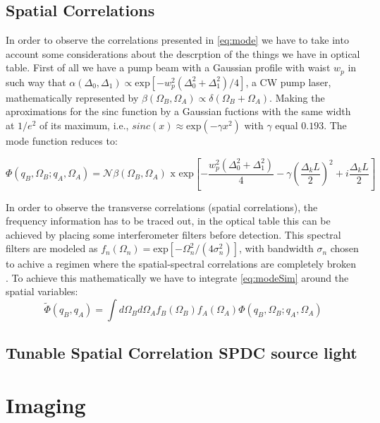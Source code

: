 \subsection{Spatial Correlations}

In order to observe the correlations presented in \ref{eq:mode} we have to take into account some considerations about the descrption of the things we have in optical table.
First of all we have a pump beam with a Gaussian profile with waist $w_p$ 
in such way that $\alpha (\Delta_0,\Delta_1 ) \propto \text{exp}[-w_p^2 (\Delta_0^2 + \Delta_1^2 )/4]$, a CW pump laser, mathematically represented by
$\beta (\Omega_B , \Omega_A) \propto \delta(\Omega_B + \Omega_A)$. Making the aproximations for the sinc function by a Gaussian fuctions with the same width at $1/e^2$ of its maximum,
i.e., $sinc(x) \approx \text{exp}(-\gamma x^2)$ with $\gamma$ equal $0.193$.
The mode function reduces to:

\begin{equation}
\label{eq:modeSim}
\Phi(q_B,\Omega_B;q_A,\Omega_A) = \mathcal{N} \beta (\Omega_B , \Omega_A)
\text{ x exp}\left[ -\frac{w_p^2 (\Delta_0^2 + \Delta_1^2 )}{4}-\gamma \left(\frac{\Delta_k L}{2} \right)^2 + i\frac{\Delta_k L}{2} \right]  
\end{equation}

In order to observe the transverse correlations (spatial correlations), the 
frequency information has to be traced out, in the optical table this can
be achieved by placing some interferometer filters before detection. This spectral
filters are modeled as $f_n (\Omega_n)=\text{exp}[-\Omega_n^2/(4\sigma_n^2)]$, with bandwidth $\sigma_n$ chosen to achive a regimen where the 
spatial-spectral correlations are completely broken \cite{broke}. 
To achieve this mathematically we have to integrate \ref{eq:modeSim} around the
spatial variables:
\begin{equation}
\tilde{\Phi}(q_B,q_A) = \int d\Omega_B d\Omega_A f_B(\Omega_B)f_A(\Omega_A) \Phi(q_B,\Omega_B;q_A,\Omega_A)
\end{equation}

\subsection{Tunable Spatial Correlation SPDC source light}

\section{Imaging}

